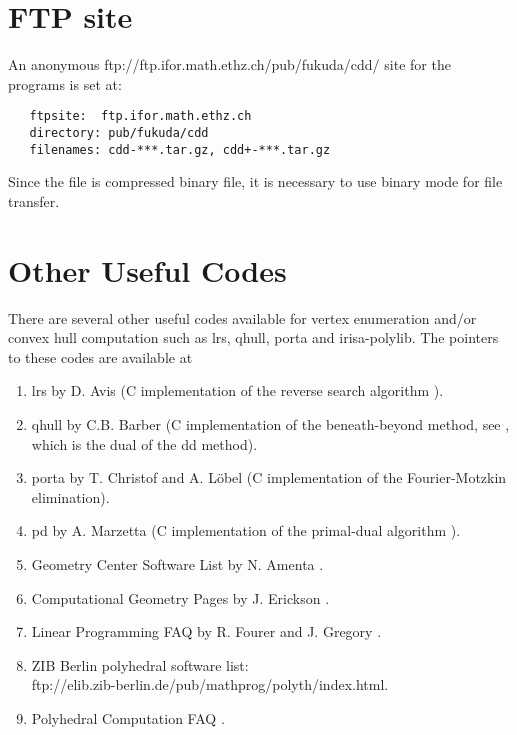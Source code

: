 \documentclass[11pt]{article}
\begin{document}
\section{FTP site}  \label{FTP}
An anonymous 
{ftp://ftp.ifor.math.ethz.ch/pub/fukuda/cdd/} site for the programs is set at:
\begin{verbatim}
   ftpsite:  ftp.ifor.math.ethz.ch
   directory: pub/fukuda/cdd
   filenames: cdd-***.tar.gz, cdd+-***.tar.gz
\end{verbatim}
Since the file is compressed binary file, it is necessary to use binary mode for
file transfer.

\section{Other Useful Codes}  \label{CODES}
There are several other useful codes available for vertex enumeration and/or
convex hull computation  such as lrs, qhull, porta and irisa-polylib.
The pointers to these codes are available at
\begin{enumerate}
\item lrs by D. Avis \cite{a-uglrs-97} (C implementation of the reverse search algorithm 
\cite{af-pachv-92}). 

\item qhull by C.B. Barber \cite{bdh-qach-95} (C implementation of
the beneath-beyond method, see \cite{e-acg-87,m-cg-94},
which is the dual of the dd method). 

\item porta by T. Christof and A. L\"obel \cite{cl-porta-97} (C implementation
of the Fourier-Motzkin elimination).

\item pd by A. Marzetta \cite{m-pdcip-97} (C implementation of the primal-dual algorithm 
\cite{bfm-pdmvf-97}). 

 \item Geometry Center Software List by N. Amenta \cite{a-dcg}.

 \item Computational Geometry Pages by J. Erickson \cite{e-cgp}.

 \item Linear Programming FAQ by R. Fourer and J. Gregory \cite{fg-lpfaq-97}.

 \item ZIB Berlin polyhedral software list:\\
{ftp://elib.zib-berlin.de/pub/mathprog/polyth/index.html}.

\item Polyhedral Computation FAQ \cite{f-pcfaq-97}.
\end{enumerate}
\end{document}
